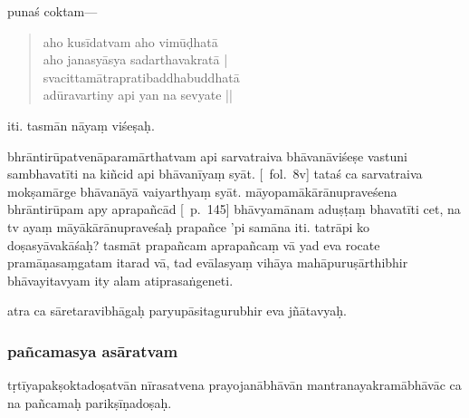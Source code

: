 \documentclass[12pt]{article}
\begin{document}
punaś coktam—

\begin{quote}
	aho kusīdatvam aho vimūḍhatā\\
	aho janasyāsya sadarthavakratā |\\
	svacittamātrapratibaddhabuddhatā\footnoteB{
		°pratibaddha°] \conj\ (\TIB; 'brel pa); °pratibuddha° \MS\ \EDD
	}\\
	adūravartiny api yan na sevyate ||
% 
\end{quote}

\noindent iti. tasmān nāyaṃ viśeṣaḥ.

bhrāntirūpatvenāparamārthatvam api sarvatraiva bhāvanāviśeṣe vastuni sambhavatīti na kiñcid api bhāvanīyaṃ syāt. [\MS\ fol.\ 8v] tataś ca sarvatraiva mokṣamārge bhāvanāyā vaiyarthyaṃ syāt. māyopamākārānupraveśena bhrāntirūpam apy aprapañcād [\EDD\ p.\ 145] bhāvyamānam\footnoteB{
	aprapañcād bhāvyamānam] \EDD ; aprapañcā bhāvyamāṇam
} aduṣṭaṃ bhavatīti cet, na tv ayaṃ māyākārānupraveśaḥ prapañce 'pi samāna iti. tatrāpi ko doṣasyāvakāśaḥ? tasmāt prapañcam aprapañcaṃ vā yad eva rocate pramāṇasaṃgatam itarad vā, tad evālasyaṃ vihāya mahāpuruṣārthibhir bhāvayitavyam\footnoteB{
	bhāvayitavyam] \EDD ; bhaviyitavyam \MS
} ity alam atiprasaṅgeneti.

atra ca sāretaravibhāgaḥ paryupāsitagurubhir eva jñātavyaḥ.

\subsubsection{pañcamasya asāratvam}
\noindent tṛtīyapakṣoktadoṣatvān nīrasatvena\footnoteB{
	nīrasatvena] \conj ; nīrasatvena te \MS\ \EDD
} prayojanābhāvān mantranayakramābhāvāc ca na pañcamaḥ parikṣīṇadoṣaḥ.

% 
\end{document}

